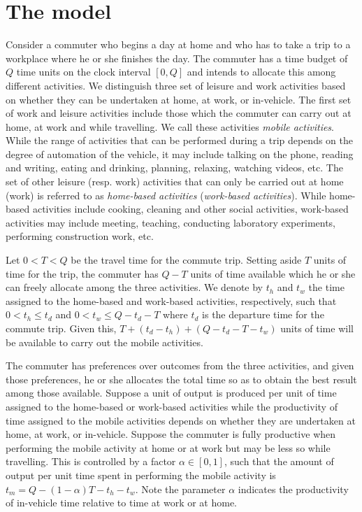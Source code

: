 \documentclass[12pt,a4paper,british]{article}
\begin{document}
\section{The model}
\label{sec:model1}

Consider a commuter who begins a day at home and who has to take a trip to a workplace where he or she finishes the day. The commuter has a time budget of $Q$ time units on the clock interval $[0, Q]$ and intends to allocate this among different activities. We distinguish three set of leisure and work activities based on whether they can be undertaken at home, at work, or in-vehicle. The first set of work and leisure activities include those which the commuter can carry out at home, at work and while travelling. We call these activities \textit{mobile activities}. While the range of activities that can be performed during a trip depends on the degree of automation of the vehicle, it may include talking on the phone, reading and writing, eating and drinking, planning, relaxing, watching videos, etc. The set of other leisure (resp. work) activities that can only be carried out at home (work) is referred to as \emph{home-based activities} (\emph{work-based activities}). While home-based activities include cooking, cleaning and other social activities, work-based activities may include meeting, teaching, conducting laboratory experiments, performing construction work, etc.


Let $0<T<Q$ be the travel time for the commute trip. Setting aside $T$ units of time for the trip, the commuter has $Q-T$ units of time available which he or she can freely allocate among the three activities. We denote by $t_{h}$ and $t_{w}$ the time assigned to the home-based and work-based activities, respectively, such that $0<t_{h}\leq t_{d}$ and $0<t_{w}\leq Q-t_{d}-T$ where $t_d$ is the departure time for the commute trip. Given this,  $T+\left(t_{d}-t_{h}\right)+\left(Q-t_{d}-T-t_{w}\right)$ units of time will be available to carry out the mobile activities.


The commuter has preferences over outcomes from the three activities, and given those preferences, he or she allocates the total time so as to obtain the best result among those available. Suppose a unit of output is produced per unit of time assigned to the home-based or work-based activities while the productivity of time assigned to the mobile activities depends on whether they are undertaken at home, at work, or in-vehicle. Suppose the commuter is fully productive when performing the mobile activity at home or at work but may be less so while travelling. This is controlled by a factor $\alpha \in \left[0, 1\right]$, such that the amount of output per unit time spent in performing the mobile activity is $t_{m} = Q - \left( 1 - \alpha \right) T - t_{h} - t_{w}$. Note the parameter $\alpha$ indicates the productivity of in-vehicle time relative to time at work or at home.
\end{document}
